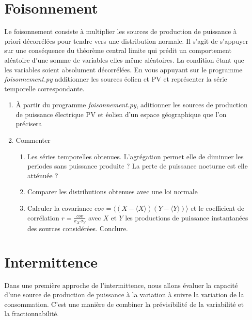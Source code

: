 \documentclass[12pt,a4,french]{article}
\newcommand{\tmtextit}[1]{{\itshape{#1}}}
\begin{document}
\section{Foisonnement}

Le foisonnement consiste à multiplier les sources de production de puissance
à priori décorrélées pour tendre vers une distribution normale. Il s'agit de s'appuyer sur une conséquence du théorème central limite qui prédit un
comportement aléatoire d'une somme de variables elles même aléatoires. La
condition étant que les variables soient absolument décorrélées. En vous
appuyant sur le programme \tmtextit{foisonnement.py} additionner les sources
éolien et PV et représenter la série temporelle correspondante.

\begin{enumerate}
  \item À partir du programme \tmtextit{foisonnement.py}, aditionner les
  sources de production de puissance électrique PV et éolien d'un espace géographique que l'on précisera 
  
  \item Commenter
  \begin{enumerate}
    \item Les séries temporelles obtenues. L'agrégation permet elle de
    diminuer les periodes sans puissance produite ? La perte de puissance
    nocturne est elle atténuée ?
    
    \item Comparer les distributions obtenues avec une loi normale
    
    \item Calculer la covariance $cov=\langle (X-\langle X \rangle)(Y - \langle Y \rangle)\rangle $ et le coefficient de corrélation $r=\frac{cov}{\sigma_X \, \sigma_Y}$ avec $X$ et $Y$ les productions de puissance instantanées des sources considérées. Conclure.
    
  \end{enumerate}
\end{enumerate}

\section{Intermittence}

Dans une première approche de l'intermittence, nous allons évaluer la
capacité d'une source de production de puissance à la variation à suivre la variation de la consommation. C'est une manière de combiner la prévisibilité de la variabilité et la fractionnabilité.
\end{document}
